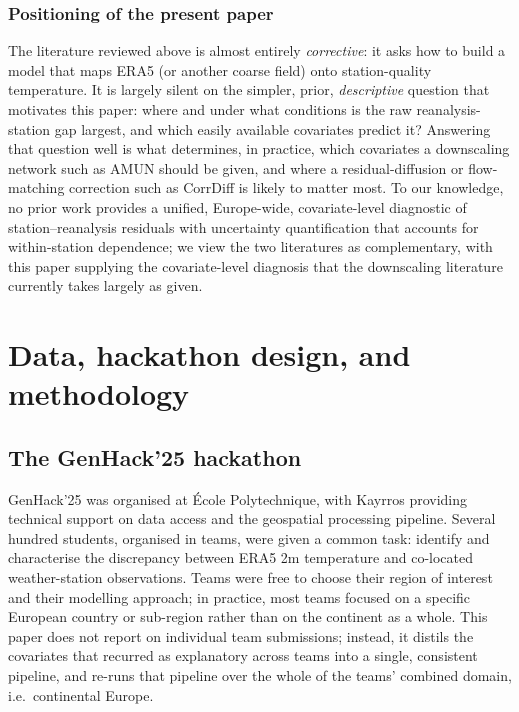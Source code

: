 \documentclass[a4paper,12pt,leqno]{article}
\begin{document}
\subsubsection{Positioning of the present paper}
\label{sec:related-diagnostics}

The literature reviewed above is almost entirely \emph{corrective}: it
asks how to build a model that maps ERA5 (or another coarse field) onto
station-quality temperature. It is largely silent on the simpler, prior,
\emph{descriptive} question that motivates this paper: where and under
what conditions is the raw reanalysis-station gap largest, and which
easily available covariates predict it? Answering that question well is
what determines, in practice, which covariates a downscaling network such
as AMUN should be given, and where a residual-diffusion or
flow-matching correction such as CorrDiff is likely to matter most. To
our knowledge, no prior work provides a unified, Europe-wide,
covariate-level diagnostic of station--reanalysis residuals with
uncertainty quantification that accounts for within-station dependence;
we view the two literatures as complementary, with this paper
supplying the covariate-level diagnosis that the downscaling literature
currently takes largely as given.

\section{Data, hackathon design, and methodology}
\label{sec:data}

\subsection{The GenHack'25 hackathon}

GenHack'25 was organised at \'Ecole Polytechnique, with Kayrros
providing technical support on data access and the geospatial processing
pipeline. Several hundred students, organised in teams, were given a
common task: identify and characterise the discrepancy between ERA5 2m
temperature and co-located weather-station observations. Teams were free
to choose their region of interest and their modelling approach; in
practice, most teams focused on a specific European country or
sub-region rather than on the continent as a whole. This paper does not
report on individual team submissions; instead, it distils the
covariates that recurred as explanatory across teams into a single,
consistent pipeline, and re-runs that pipeline over the whole of the
teams' combined domain, i.e.\ continental Europe.
\end{document}
